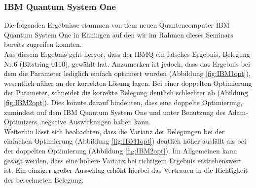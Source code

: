 \subsubsection{IBM Quantum System One}
Die folgenden Ergebnisse stammen von dem neuen Quantencomputer IBM Quantum System One in Ehningen auf den wir im Rahmen dieses Seminars bereits zugreifen konnten.\\
Aus diesem Ergebnis geht hervor, dass der IBMQ ein falsches Ergebnis, Belegung Nr.6 (Bitstring 0110), gewählt hat. Anzumerken ist jedoch, dass das Ergebnis bei dem die Parameter lediglich einfach optimiert wurden (Abbildung \ref{fig:IBM1opt}), wesentlich näher an der korrekten Lösung lagen. Bei einer doppelten Optimierung der Parameter, schneidet die korrekte Belegung deutlich schlechter ab (Abildung \ref{fig:IBM2opt}). Dies könnte darauf hindeuten, dass eine doppelte Optimierung, zumindest auf dem IBM Quantum System One und unter Benutzung des Adam-Optimizers, negative Auswirkungen haben kann.\\
Weiterhin lässt sich beobachten, dass die Varianz der Belegungen bei der einfachen Optimierung (Abbildung \ref{fig:IBM1opt}) deutlich höher ausfällt als bei der doppelten Optimierung (Abbildung \ref{fig:IBM2opt}). Im Allgemeinen kann gesagt werden, dass eine höhere Varianz bei richtigem Ergebnis erstrebenswert ist. Ein einziger großer Ausschlag erhöht hierbei das Vertrauen in die Richtigkeit der berechneten Belegung.

